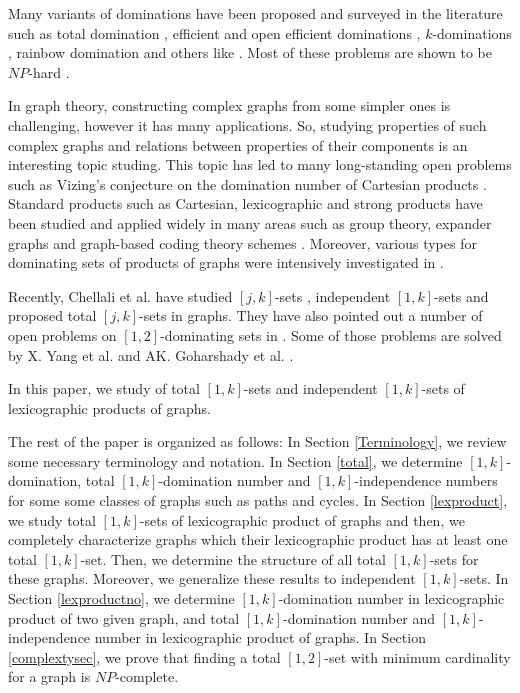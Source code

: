 \documentclass[A4,12pt]{article}
\theoremstyle{definition}
\theoremstyle{remark}
\begin{document}
	Many variants of dominations have been proposed  and  surveyed  in the literature such as total domination \cite{henning2013total}, efficient and open efficient 	dominations \cite{bange1988efficient,  gavlas2002efficient}, $k$-dominations \cite{chellali2012k, haas2014k}, rainbow domination \cite{bresar2008rainbow} and others like \cite{allan1978domination , yannakakis1980edge,Chang201289 , haynes1998paired, haynes1998fundamentals,Zhao201428}. Most of these problems are shown to be $NP$-hard  \cite{bange1988efficient, Chang201289, haynes1998paired, Zhao201428}.
	
	
	In graph theory, constructing complex graphs from some simpler ones is challenging, however it has many applications. So, studying properties of such complex  graphs and relations between properties of their components  is an interesting topic studing. This topic has led to many long-standing open problems such as Vizing's conjecture on the domination number of Cartesian products \cite{hartnell1991vizing}. Standard products such as Cartesian, lexicographic and strong products have been studied and applied widely in many areas such as group theory, expander graphs and graph-based coding theory schemes \cite{hammack2011handbook, imrichklav, hoory2006expander}. Moreover, various types for dominating sets of products of graphs were intensively investigated in \cite{nowakowski1996associative, henning2013total, dorbec2006some , kuziak2014efficient , gravier1997domination , rall2005total , hartnell2004dominating, li2009total}.
	
	Recently, Chellali et al. have studied $[j, k]$-sets \cite{chellali20131}, independent $[1, k]$-sets \cite{chellali2014independent} and proposed  total $[j,k]$-sets  in graphs.
	They have also pointed out a number of open problems on $[1,2]$-dominating sets in \cite{chellali20131}. Some of those problems are solved by X. Yang et al. \cite{yang20141} and AK. Goharshady et al. \cite{goharshady20161}.
	
	
	In this paper, we study of total $[1,k]$-sets and independent $[1,k]$-sets of lexicographic products of graphs.
	
	The rest of the paper is organized as follows:  In Section \ref{Terminology}, we review some necessary terminology and notation. In Section \ref{total}, we determine  $[1,k]$-domination, total $[1,k]$-domination number and $[1,k]$-independence numbers for some some classes of graphs such as paths and cycles. In Section \ref{lexproduct}, we study total $[1,k]$-sets  of lexicographic product of graphs and then, we completely characterize graphs which their lexicographic product has  at least one total $[1,k]$-set. Then, we determine the structure of all total $[1,k]$-sets for these graphs. Moreover, we generalize these results to independent $[1,k]$-sets. In Section \ref{lexproductno}, we  determine  $[1,k]$-domination number in lexicographic product of two given graph, and total $[1,k]$-domination number and  $[1,k]$-independence number in lexicographic product of graphs. In Section \ref{complextysec}, we prove that finding a total $[1,2]$-set with minimum cardinality for a graph is $NP$-complete.
	
\end{document}
